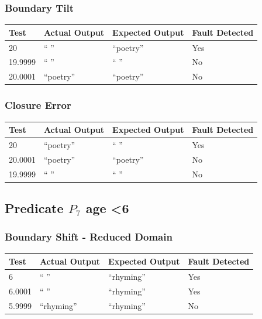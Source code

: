 \documentclass[11pt, oneside]{article}   	%
\begin{document}
\subsubsection{Boundary Tilt}
\begin{table}[!htb]
\centering
\begin{tabular}{|l|l|l|l|}
\hline
Test    & Actual Output & Expected Output & Fault Detected \\ \hline
20      & “ ”           & “poetry”        & Yes            \\ \hline
19.9999 & “ ”           & “ ”             & No             \\ \hline
20.0001 & “poetry”      & “poetry”        & No             \\ \hline
\end{tabular}
\end{table}

\subsubsection{Closure Error}
\begin{table}[!htb]
\centering
\begin{tabular}{|l|l|l|l|}
\hline
Test    & Actual Output & Expected Output & Fault Detected \\ \hline
20      & “poetry”      & “ ”             & Yes            \\ \hline
20.0001 & “poetry”      & “poetry”        & No             \\ \hline
19.9999 & “ ”           & “ ”             & No             \\ \hline
\end{tabular}
\end{table}
\newpage

\subsection{Predicate $P_7$ age \textless 6}
\subsubsection{Boundary Shift - Reduced Domain}
\begin{table}[!htb]
\centering
\begin{tabular}{|l|l|l|l|}
\hline
Test   & Actual Output & Expected Output & Fault Detected \\ \hline
6      & “ ”           & “rhyming”       & Yes            \\ \hline
6.0001 & “ ”           & “rhyming”       & Yes            \\ \hline
5.9999 & “rhyming”     & “rhyming”       & No             \\ \hline
\end{tabular}
\end{table}
\end{document}
